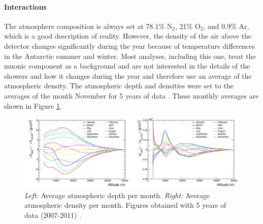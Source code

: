 \begin{table}[]
\centering
\caption{Best fit for parameters in Eq. \ref{eq:gaisser}. Numbers taken from Ref. \cite{Gaisser:2013bla}.}
\label{tab:fluxnormalization}
\end{table}

\paragraph{Interactions}
The atmosphere composition is always set at 78.1\% N$_2$, 21\% O$_2$, and 0.9\% Ar, which is a good description of reality. However, the density of the air above the detector changes significantly during the year because of temperature differences in the Antarctic summer and winter. Most analyses, including this one, treat the muonic component as a background and are not interested in the details of the showers and how it changes during the year and therefore use an average of the atmospheric density. The atmospheric depth and densities were set to the averages of the month November for 5 years of data \cite{samDeRidder}. These monthly averages are shown in Figure \ref{fig:atmosphere}.\\

\begin{figure}
\centering
\includegraphics[width=\textwidth]{chapter6/img/atmosphere.png}
\caption{\textit{Left: }Average atmospheric depth per month. \textit{Right: }Average atmospheric density per month. Figures obtained with 5 years of data (2007-2011) \cite{samDeRidder}.}
\label{fig:atmosphere}
\end{figure}


